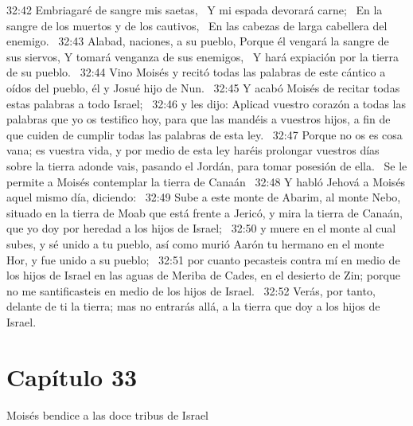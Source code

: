 32:42 Embriagaré de sangre mis saetas,  
Y mi espada devorará carne;  
En la sangre de los muertos y de los cautivos,  
En las cabezas de larga cabellera del enemigo.  
32:43 Alabad, naciones, a su pueblo, 
Porque él vengará la sangre de sus siervos, 
Y tomará venganza de sus enemigos,  
Y hará expiación por la tierra de su pueblo.  
32:44 Vino Moisés y recitó todas las palabras de este cántico a oídos del pueblo, él y Josué hijo de Nun.  
32:45 Y acabó Moisés de recitar todas estas palabras a todo Israel;  
32:46 y les dijo: Aplicad vuestro corazón a todas las palabras que yo os testifico hoy, para que las mandéis a vuestros hijos, a fin de que cuiden de cumplir todas las palabras de esta ley.  
32:47 Porque no os es cosa vana; es vuestra vida, y por medio de esta ley haréis prolongar vuestros días sobre la tierra adonde vais, pasando el Jordán, para tomar posesión de ella.  
Se le permite a Moisés contemplar la tierra de Canaán  
32:48 Y habló Jehová a Moisés aquel mismo día, diciendo:  
32:49 Sube a este monte de Abarim, al monte Nebo, situado en la tierra de Moab que está frente a Jericó, y mira la tierra de Canaán, que yo doy por heredad a los hijos de Israel;  
32:50 y muere en el monte al cual subes, y sé unido a tu pueblo, así como murió Aarón tu hermano en el monte Hor, y fue unido a su pueblo;  
32:51 por cuanto pecasteis contra mí en medio de los hijos de Israel en las aguas de Meriba de Cades, en el desierto de Zin; porque no me santificasteis en medio de los hijos de Israel.  
32:52 Verás, por tanto, delante de ti la tierra; mas no entrarás allá, a la tierra que doy a los hijos de Israel.  
\section*{Capítulo 33 }
Moisés bendice a las doce tribus de Israel  

